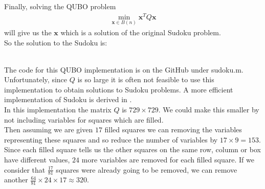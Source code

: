 \documentclass{article}
\begin{document}
\noindent Finally, solving the QUBO problem
\begin{align*}
    \min_{\mathbf{x} \in B(n)} \mathbf{x}^T Q \mathbf{x}
\end{align*}
will give us the \(\mathbf{x}\) which is a solution of the original Sudoku problem.\\

\noindent So the solution to the Sudoku is:

\hspace{92pt}\begin{lpsudoku}[scale=0.5]
\end{lpsudoku}\\

\noindent The code for this QUBO implementation is on the GitHub under sudoku.m.\\
 
\noindent Unfortunately, since \(Q\) is so large it is often not feasible to use this implementation to obtain solutions to Sudoku problems. A more efficient implementation of Sudoku is derived in \cite{mücke2024sudoku}.\\

\noindent In this implementation the matrix \(Q\) is \(729 \times 729\). We could make this smaller by not including variables for squares which are filled. \\ 
Then assuming we are given \(17\) filled squares we can removing the variables representing these squares and so reduce the number of variables by \(17 \times 9 = 153\).\\
Since each filled square tells us the other squares on the same row, column or box have different values, \(24\) more variables are removed for each filled square. If we consider that \(\frac{17}{81}\) squares were already going to be removed, we can remove another \(\frac{64}{81} \times 24 \times 17 \approx 320\).\\
\end{document}

